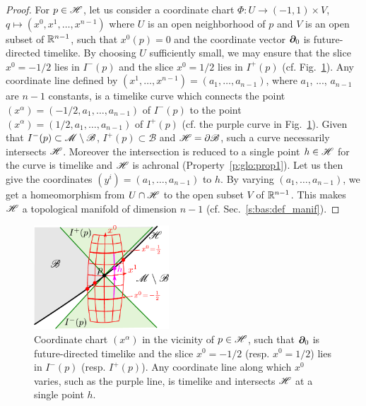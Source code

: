 \begin{proof}
For $p\in\mathscr{H}$, let us consider a coordinate chart
$\Phi: U \to (-1,1)\times V$, $q\mapsto (x^0,x^1,\ldots,x^{n-1})$ where
$U$ is an open neighborhood of $p$ and
$V$ is an open subset of $\mathbb{R}^{n-1}$, such that $x^0(p) = 0$ and the coordinate vector $\bm{\partial}_0$ is future-directed timelike.
By choosing $U$ sufficiently small, we may ensure that the slice $x^0=-1/2$ lies in $I^-(p)$
and the slice $x^0=1/2$ lies in $I^+(p)$ (cf. Fig.~\ref{f:glo:topmanif_chart}). Any coordinate line defined by
$(x^1,\ldots,x^{n-1}) = (a_1,\ldots,a_{n-1})$,
where $a_1$, ..., $a_{n-1}$ are $n-1$ constants, is a timelike curve which connects
the point $(x^\alpha)=(-1/2,a_1,\ldots,a_{n-1})$ of $I^-(p)$ to
the point $(x^\alpha)=(1/2,a_1,\ldots,a_{n-1})$ of $I^+(p)$ (cf. the purple curve in Fig.~\ref{f:glo:topmanif_chart}). Given that $I^-(p)\subset \mathscr{M}\setminus\mathscr{B}$, $I^+(p)\subset\mathscr{B}$ and $\mathscr{H} = \partial\mathscr{B}$,
such a curve
necessarily intersects  $\mathscr{H}$. Moreover the intersection is reduced
to a single point $h\in\mathscr{H}$ for the curve is timelike and $\mathscr{H}$ is
achronal (Property~\ref{p:glo:prop1}).
Let us then give the coordinates $(y^i) = (a_1,\ldots,a_{n-1})$ to $h$.
By varying $(a_1,\ldots,a_{n-1})$, we get a homeomorphism from $U\cap\mathscr{H}$
to the open subset $V$ of $\mathbb{R}^{n-1}$. This makes $\mathscr{H}$ a topological manifold of
dimension $n-1$ (cf. Sec.~\ref{s:bas:def_manif}).
\end{proof}

\begin{figure}
\centerline{\includegraphics[width=0.45\textwidth]{glo_topmanif_chart.pdf}}
\caption[]{\label{f:glo:topmanif_chart} \footnotesize
Coordinate chart $(x^\alpha)$ in the vicinity of $p\in\mathscr{H}$, such that
$\bm{\partial}_0$ is future-directed timelike and the slice $x^0=-1/2$ (resp. $x^0=1/2$)
lies in $I^-(p)$ (resp. $I^+(p)$). Any coordinate line along which $x^0$ varies,
such as the purple line, is timelike and intersects $\mathscr{H}$ at a single point $h$.}
\end{figure}

